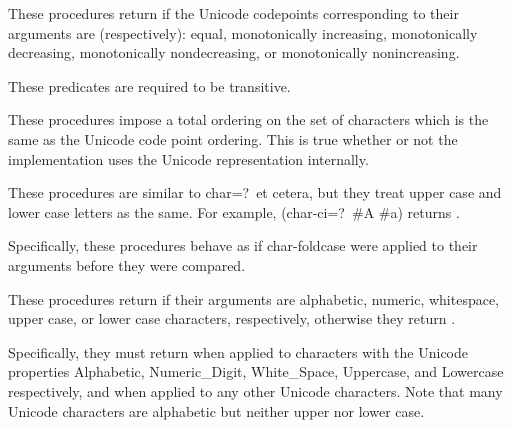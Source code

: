 \begin{entry}{%
}

\label{characterequality}

These procedures return \schtrue{} if the Unicode codepoints corresponding to their arguments are (respectively):
equal, monotonically increasing, monotonically decreasing,
monotonically nondecreasing, or monotonically nonincreasing.

These predicates are required to be transitive.

These procedures impose a total ordering on the set of characters which
is the same as the Unicode code point ordering.  This is true 
whether or not the implementation uses the Unicode representation internally.

\end{entry}


\begin{entry}{%
}

These procedures are similar to {\cf char=?}\ et cetera, but they treat
upper case and lower case letters as the same.  For example, {\cf
(char-ci=?\ \#\backwhack{}A \#\backwhack{}a)} returns \schtrue.

Specifically, these procedures behave as if {\cf char-foldcase} were
applied to their arguments before they were compared.

\end{entry}


\begin{entry}{%
}

These procedures return \schtrue{} if their arguments are alphabetic,
numeric, whitespace, upper case, or lower case characters, respectively,
otherwise they return \schfalse.  

Specifically, they must return \schtrue{} when applied to characters with
the Unicode properties Alphabetic, Numeric\_Digit, White\_Space, Uppercase, and
Lowercase respectively, and \schfalse{} when applied to any other Unicode
characters.  Note that many Unicode characters are alphabetic but neither
upper nor lower case.

\end{entry}


